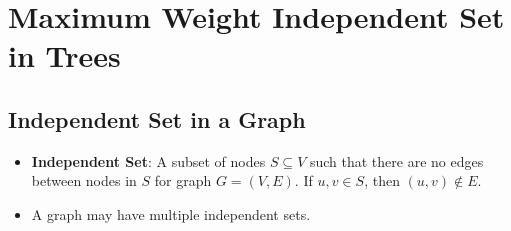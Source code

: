 \documentclass[12pt]{article}
\date{March 18, 2021}
\begin{document}
\maketitle

\section{Maximum Weight Independent Set in Trees}

\subsection{Independent Set in a Graph}
\begin{itemize}
    \item \textbf{Independent Set}: A subset of nodes $S \subseteq V$ such that there are no edges between nodes in $S$ for graph $G = (V, E)$. If $u, v \in S$, then $(u, v) \notin E$.
    \item A graph may have multiple independent sets.
\end{itemize}
\end{document}
